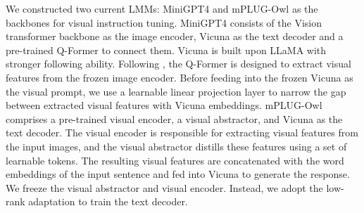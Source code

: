\vspace{-0.1in}
We constructed two current LMMs: MiniGPT4 \cite{zhu2023minigpt} and mPLUG-Owl \cite{ye2023mplug} as the backbones for visual instruction tuning. MiniGPT4 consists of the Vision transformer \cite{liu2023covid} backbone as the image encoder, Vicuna \cite{chiang2023vicuna} as the text decoder and a pre-trained Q-Former to connect them. Vicuna is built upon LLaMA \cite{touvron2023llama} with stronger following ability. Following \cite{zhu2023minigpt}, the Q-Former is designed to extract visual features from the frozen image encoder. Before feeding into the frozen Vicuna as the visual prompt, we use a learnable linear projection layer to narrow the gap between extracted visual features with Vicuna embeddings. mPLUG-Owl comprises a pre-trained visual encoder, a visual abstractor, and Vicuna \cite{chiang2023vicuna} as the text decoder. The visual encoder is responsible for extracting visual features from the input images, and the visual abstractor distills these features using a set of learnable tokens. The resulting visual features are concatenated with the word embeddings of the input sentence and fed into Vicuna to generate the response. We freeze the visual abstractor and visual encoder. Instead, we adopt the low-rank adaptation \cite{hu2021lora} to train the text decoder.





